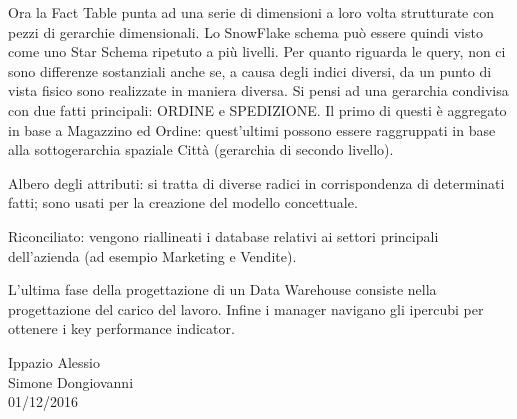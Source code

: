 Ora la Fact Table punta ad una serie di dimensioni a loro volta strutturate con pezzi di gerarchie dimensionali. Lo SnowFlake schema può essere quindi visto come uno Star Schema ripetuto a più livelli. Per quanto riguarda le query, non ci sono differenze sostanziali anche se, a causa degli indici diversi, da un punto di vista fisico sono realizzate in maniera diversa. Si pensi ad una gerarchia condivisa con due fatti principali: ORDINE e SPEDIZIONE. Il primo di questi è aggregato in base a Magazzino ed Ordine: quest’ultimi possono essere raggruppati in base alla sottogerarchia spaziale Città (gerarchia di secondo livello).  

Albero degli attributi: si tratta di diverse radici in corrispondenza di determinati fatti; sono usati per la creazione del modello concettuale.  

Riconciliato: vengono riallineati i database relativi ai settori principali dell’azienda (ad esempio Marketing e Vendite).  

L’ultima fase della progettazione di un Data Warehouse consiste nella progettazione del carico del lavoro. Infine i manager navigano gli ipercubi per ottenere i key performance indicator.  



\begin{flushright}Ippazio Alessio\\Simone Dongiovanni\\01/12/2016\end{flushright}